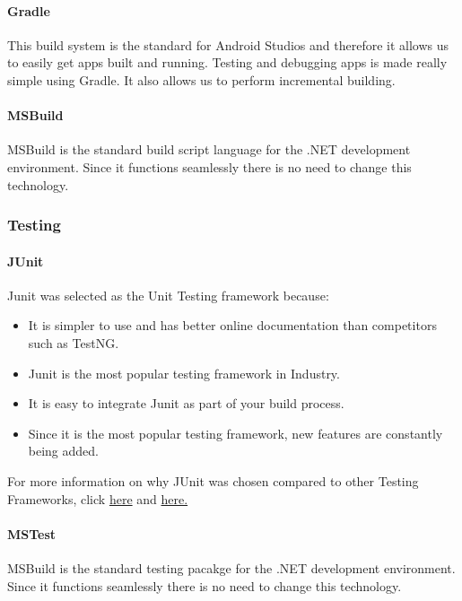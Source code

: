 \documentclass[11pt,a4paper,titlepage]{article}
\begin{document}
			\paragraph{Gradle}
				This build system is the standard for Android Studios and therefore it allows us to easily get apps built and running. Testing and debugging apps is made really simple using Gradle. It also allows us to perform incremental building. 
			\paragraph{MSBuild}
				MSBuild is the standard build script language for the .NET development environment. Since it functions seamlessly there is no need to change this technology.
		\subsubsection{Testing}
			\paragraph{JUnit}
				Junit was selected as the Unit Testing framework because:
					\begin{itemize}	
						\item It is simpler to use and has better online documentation than competitors such as TestNG.
						\item Junit is the most popular testing framework in Industry. 
						\item It is easy to integrate Junit as part of your build process. 
						\item Since it is the most popular testing framework,  new features are constantly  being added.
					\end{itemize}
For more information on why JUnit was chosen compared to other Testing Frameworks, click \href{http://blog.javafortesters.com/2014/09/faq-should-i-use-junit-or-testng-which.html}{here} and
\href{https://seleniumonlinetrainingexpert.wordpress.com/2012/11/21/what-are-advantages-of-testing-with-junit/}{here.} \newline

			\paragraph{MSTest}
				MSBuild is the standard testing pacakge for the .NET development environment. Since it functions seamlessly there is no need to change this technology.
		
\end{document}
